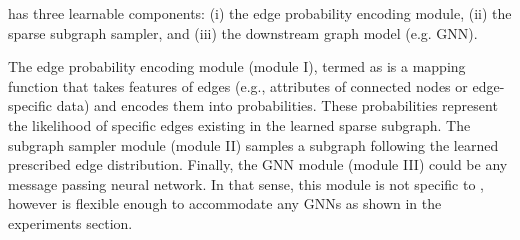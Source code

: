 \sgs has three learnable components: (i) the edge probability encoding module, (ii) the sparse subgraph sampler, and (iii) the downstream graph model (e.g. GNN).

The edge probability encoding module (module I), termed as \edgemlp is a mapping function that takes features of edges (e.g., attributes of connected nodes or edge-specific data) and encodes them into probabilities. These probabilities represent the likelihood of specific edges existing in the learned sparse subgraph. The subgraph sampler module (module II) samples a subgraph following the learned prescribed edge distribution. 
Finally, the GNN module (module III) could be any message passing neural network. In that sense, this module is not specific to \sgs, however \sgs is flexible enough to accommodate any GNNs as shown in the experiments section. 



